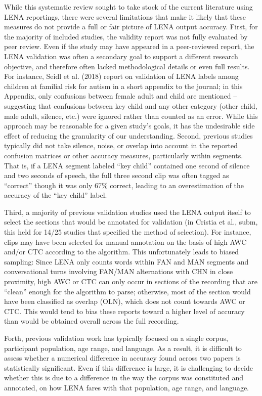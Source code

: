 \documentclass[english,floatsintext,man]{apa6}
\begin{document}
While this systematic review sought to take stock of the current
literature using LENA reportings, there were several limitations that
make it likely that these measures do not provide a full or fair picture
of LENA output accuracy. First, for the majority of included studies,
the validity report was not fully evaluated by peer review. Even if the
study may have appeared in a peer-reviewed report, the LENA validation
was often a secondary goal to support a different research objective,
and therefore often lacked methodological details or even full results.
For instance, Seidl et al. (2018) report on validation of LENA labels
among children at familial risk for autism in a short appendix to the
journal; in this Appendix, only confusions between female adult and
child are mentioned -- suggesting that confusions between key child and
any other category (other child, male adult, silence, etc.) were ignored
rather than counted as an error. While this approach may be reasonable
for a given study's goals, it has the undesirable side effect of
reducing the granularity of our understanding. Second, previous studies
typically did not take silence, noise, or overlap into account in the
reported confusion matrices or other accuracy measures, particularly
within segments. That is, if a LENA segment labeled \enquote{key child}
contained one second of silence and two seconds of speech, the full
three second clip was often tagged as \enquote{correct} though it was
only 67\% correct, leading to an overestimation of the accuracy of the
\enquote{key child} label.

Third, a majority of previous validation studies used the LENA output
itself to select the sections that would be annotated for validation (in
Cristia et al., subm, this held for 14/25 studies that specified the
method of selection). For instance, clips may have been selected for
manual annotation on the basis of high AWC and/or CTC according to the
algorithm. This unfortunately leads to biased sampling: Since LENA only
counts words within FAN and MAN segments and conversational turns
involving FAN/MAN alternations with CHN in close proximity, high AWC or
CTC can only occur in sections of the recording that are \enquote{clean}
enough for the algorithm to parse; otherwise, most of the section would
have been classified as overlap (OLN), which does not count towards AWC
or CTC. This would tend to bias these reports toward a higher level of
accuracy than would be obtained overall across the full recording.

Forth, previous validation work has typically focused on a single
corpus, participant population, age range, and language. As a result, it
is difficult to assess whether a numerical difference in accuracy found
across two papers is statistically significant. Even if this difference
is large, it is challenging to decide whether this is due to a
difference in the way the corpus was constituted and annotated, on how
LENA fares with that population, age range, and language.
\end{document}
